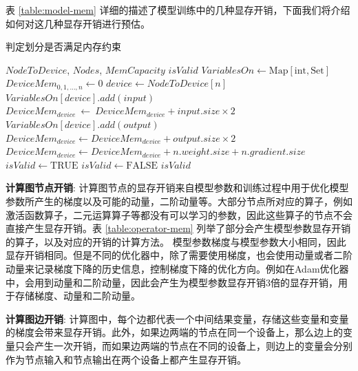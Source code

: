 表 \ref{table:model-mem} 详细的描述了模型训练中的几种显存开销，下面我们将介绍如何对这几种显存开销进行预估。


\begin{algorithm}[h]
	\caption{判定划分是否满足内存约束}
	\label{alg:estimate-mem}
	\begin{algorithmic}[1]
	\REQUIRE $\mathit{NodeToDevice}$, $\mathit{Nodes}$, $\mathit{MemCapacity}$
	\ENSURE  $\mathit{isValid}$
	\STATE   $\mathit{VariablesOn} \leftarrow \mathrm{Map}[\mathrm{int}, \mathrm{Set}]$
	\STATE   $\mathit{DeviceMem}_{0,1,\dots,n} \leftarrow 0$
		\STATE $device \leftarrow \mathit{NodeToDevice}[n]$
				\STATE $\mathit{VariablesOn}[device].add(input)$
				\STATE $\mathit{DeviceMem}_{device}\ \leftarrow \ \mathit{DeviceMem}_{device} + input.size \times 2 $
			\ENDIF
		\ENDFOR
				\STATE $\mathit{VariablesOn}[device].add(output)$
				\STATE $\mathit{DeviceMem}_{device} \leftarrow  \mathit{DeviceMem}_{device} + output.size \times 2 $
			\ENDIF
		\ENDFOR
		\STATE $\mathit{DeviceMem}_{device} \leftarrow  \mathit{DeviceMem}_{device} + n.weight.size + n.gradient.size$
	\ENDFOR
	\STATE $\mathit{isValid}\leftarrow \mathrm{TRUE}$
			\STATE $\mathit{isValid}\leftarrow \mathrm{FALSE}$
		\ENDIF
	\ENDFOR
	\RETURN $\mathit{isValid}$
	\end{algorithmic}
\end{algorithm}

\textbf{计算图节点开销}: 计算图节点的显存开销来自模型参数和训练过程中用于优化模型参数所产生的梯度以及可能的动量，二阶动量等。大部分节点所对应的算子，例如激活函数算子，二元运算算子等都没有可以学习的参数，因此这些算子的节点不会直接产生显存开销。表 \ref{table:operator-mem} 列举了部分会产生模型参数显存开销的算子，以及对应的开销的计算方法。
模型参数梯度与模型参数大小相同，因此显存开销相同。但是不同的优化器中，除了需要使用梯度，也会使用动量或者二阶动量来记录梯度下降的历史信息，控制梯度下降的优化方向。例如在Adam优化器  中，会用到动量和二阶动量，因此会产生为模型参数显存开销3倍的显存开销，用于存储梯度、动量和二阶动量。

\textbf{计算图边开销}: 计算图中，每个边都代表一个中间结果变量，存储这些变量和变量的梯度会带来显存开销。此外，如果边两端的节点在同一个设备上，那么边上的变量只会产生一次开销，而如果边两端的节点在不同的设备上，则边上的变量会分别作为节点输入和节点输出在两个设备上都产生显存开销。


